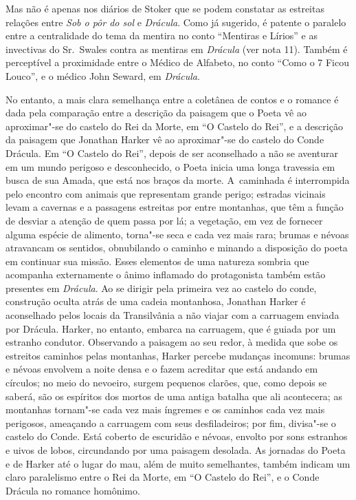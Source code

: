Mas não é apenas nos diários de Stoker que se podem constatar as
estreitas relações entre \emph{Sob o pôr do sol} e \emph{Drácula}. Como já sugerido, é
patente o paralelo entre a centralidade do tema da mentira no conto
``Mentiras e Lírios'' e as invectivas do Sr.~Swales contra as mentiras
em \emph{Drácula} (ver nota 11). Também é perceptível a proximidade entre o
Médico de Alfabeto, no conto ``Como o 7 Ficou Louco'', e o médico John
Seward, em \emph{Drácula}.

No entanto, a mais clara semelhança entre a coletânea de contos e o
romance é dada pela comparação entre a descrição da paisagem que o Poeta
vê ao aproximar"-se do castelo do Rei da Morte, em ``O Castelo do Rei'',
e a descrição da paisagem que Jonathan Harker vê ao aproximar"-se do
castelo do Conde Drácula. Em ``O Castelo do Rei'', depois de ser
aconselhado a não se aventurar em um mundo perigoso e desconhecido, o
Poeta inicia uma longa travessia em busca de sua Amada, que está nos
braços da morte. A~caminhada é interrompida pelo encontro com animais
que representam grande perigo; estradas vicinais levam a cavernas e a
passagens estreitas por entre montanhas, que têm a função de desviar a
atenção de quem passa por lá; a vegetação, em vez de fornecer alguma
espécie de alimento, torna"-se seca e cada vez mais rara; brumas e névoas
atravancam os sentidos, obnubilando o caminho e minando a disposição do
poeta em continuar sua missão. Esses elementos de uma natureza sombria
que acompanha externamente o ânimo inflamado do protagonista também
estão presentes em \emph{Drácula}. Ao se dirigir pela primeira vez ao
castelo do conde, construção oculta atrás de uma cadeia montanhosa,
Jonathan Harker é aconselhado pelos locais da Transilvânia a não viajar
com a carruagem enviada por Drácula. Harker, no entanto, embarca na
carruagem, que é guiada por um estranho condutor. Observando a paisagem
ao seu redor, à medida que sobe os estreitos caminhos pelas montanhas,
Harker percebe mudanças incomuns: brumas e névoas envolvem a noite densa
e o fazem acreditar que está andando em círculos; no meio do nevoeiro,
surgem pequenos clarões, que, como depois se saberá, são os espíritos
dos mortos de uma antiga batalha que ali acontecera; as montanhas
tornam"-se cada vez mais íngremes e os caminhos cada vez mais perigosos,
ameaçando a carruagem com seus desfiladeiros; por fim, divisa"-se o
castelo do Conde. Está coberto de escuridão e névoas, envolto por sons
estranhos e uivos de lobos, circundando por uma paisagem desolada. As
jornadas do Poeta e de Harker até o lugar do mau, além de muito
semelhantes, também indicam um claro paralelismo entre o Rei da Morte,
em ``O Castelo do Rei'', e o Conde Drácula no romance homônimo.


